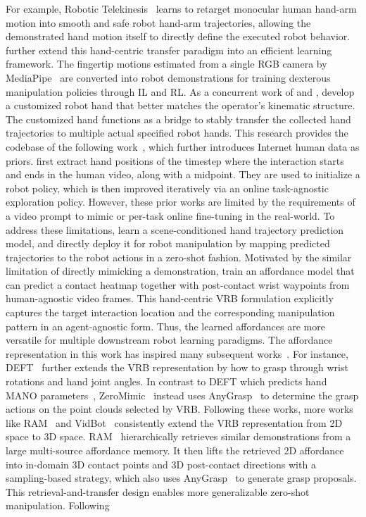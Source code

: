 \documentclass[Afour,sageh,times]{sagej}
\begin{document}
For example, Robotic Telekinesis~\citep{sivakumar2022robotic} learns to retarget monocular human hand-arm motion into smooth and safe robot hand-arm trajectories, allowing the demonstrated hand motion itself to directly define the executed robot behavior. \cite{arunachalam2022dexterous} further extend this hand-centric transfer paradigm into an efficient learning framework. The fingertip motions estimated from a single RGB camera by MediaPipe~\citep{zhang2020mediapipe} are converted into robot demonstrations for training dexterous manipulation policies through IL and RL. As a concurrent work of \cite{sivakumar2022robotic} and \cite{arunachalam2022dexterous}, \cite{qin2022one} develop a customized robot hand that better matches the operator's kinematic structure. The customized hand functions as a bridge to stably transfer the collected hand trajectories to multiple actual specified robot hands. This research provides the codebase of the following work~\citep{singh2025hand}, which further introduces Internet human data as priors. \cite{bahl2022human} first extract hand positions of the timestep where the interaction starts and ends in the human video, along with a midpoint. They are used to initialize a robot policy, which is then improved iteratively via an online task-agnostic exploration policy. However, these prior works are limited by the requirements of a video prompt to mimic or per-task online fine-tuning in the real-world. To address these limitations, \cite{bharadhwaj2023zero} learn a scene-conditioned hand trajectory prediction model, and directly deploy it for robot manipulation by mapping predicted trajectories to the robot actions in a zero-shot fashion. Motivated by the similar limitation of directly mimicking a demonstration, \cite{bahl2023affordances} train an affordance model that can predict a contact heatmap together with post-contact wrist waypoints from human-agnostic video frames. This hand-centric VRB formulation explicitly captures the target interaction location and the corresponding manipulation pattern in an agent-agnostic form. Thus, the learned affordances are more versatile for multiple downstream robot learning paradigms. The affordance representation in this work has inspired many subsequent works~\citep{kannan2023deft,kuang2024ram,shi2025zeromimic,chen2025vidbot,ma2025uni}. For instance, DEFT~\citep{kannan2023deft} further extends the VRB representation by how to grasp through wrist rotations and hand joint angles. In contrast to DEFT which predicts hand MANO parameters~\citep{romero2022embodied}, ZeroMimic~\citep{shi2025zeromimic} instead uses AnyGrasp~\citep{fang2023anygrasp} to determine the grasp actions on the point clouds selected by VRB. Following these works, more works like RAM~\citep{kuang2024ram} and VidBot~\citep{chen2025vidbot} consistently extend the VRB representation from 2D space to 3D space. RAM~\citep{kuang2024ram} hierarchically retrieves similar demonstrations from a large multi-source affordance memory. It then lifts the retrieved 2D affordance into in-domain 3D contact points and 3D post-contact directions with a sampling-based strategy, which also uses AnyGrasp~\citep{fang2023anygrasp} to generate grasp proposals. This retrieval-and-transfer design enables more generalizable zero-shot manipulation. Following 
\end{document}
